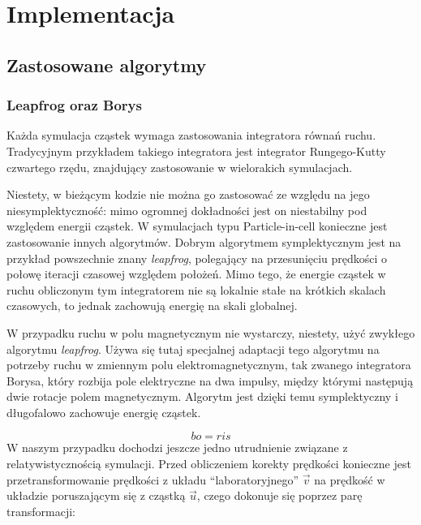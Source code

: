 \section[Implementacja]{Implementacja}%
    \subsection{Zastosowane algorytmy}
    \subsubsection{Leapfrog oraz Borys}
    Każda symulacja cząstek wymaga zastosowania integratora równań ruchu. Tradycyjnym przykładem takiego
    integratora jest integrator Rungego-Kutty czwartego rzędu, znajdujący zastosowanie w wielorakich
    symulacjach. 

    Niestety, w bieżącym kodzie nie można go zastosować ze względu na jego niesymplektyczność:
    mimo ogromnej dokładności jest on niestabilny pod względem energii cząstek. 
    W symulacjach typu Particle-in-cell konieczne jest zastosowanie innych algorytmów. Dobrym algorytmem
    symplektycznym jest na przykład powszechnie znany \emph{leapfrog}, polegający na
    przesunięciu prędkości o połowę iteracji czasowej względem położeń.
    Mimo tego, że energie cząstek w ruchu obliczonym tym integratorem nie są lokalnie stałe na krótkich skalach
    czasowych, to jednak zachowują energię na skali globalnej.


    W przypadku ruchu w polu magnetycznym nie wystarczy, niestety, użyć zwykłego algorytmu \emph{leapfrog}. 
    Używa się tutaj specjalnej adaptacji tego algorytmu na potrzeby ruchu w zmiennym polu elektromagnetycznym,
    tak zwanego integratora Borysa, 
    który rozbija pole elektryczne na dwa impulsy, między którymi następują dwie 
    rotacje polem magnetycznym. Algorytm jest dzięki temu symplektyczny
    i długofalowo zachowuje energię cząstek.

    \begin{equation}
        bo = ris
        \label{eqn:boris-pusher}
    \end{equation}
    W naszym przypadku dochodzi jeszcze jedno utrudnienie związane z relatywistycznością symulacji. 
    Przed obliczeniem korekty prędkości konieczne jest przetransformowanie prędkości z układu ``laboratoryjnego'' $\vec{v}$
    na prędkość w układzie poruszającym się z cząstką $\vec{u}$, czego dokonuje się poprzez parę transformacji:


